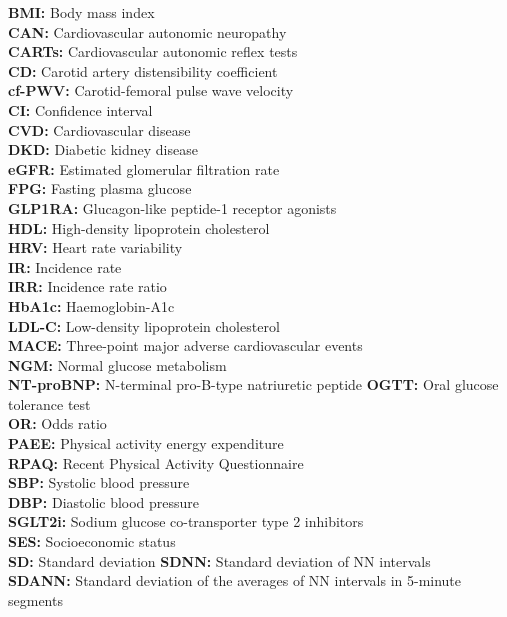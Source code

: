 \documentclass[
  a4paper,
  headsepline=true,
  open=any]{scrbook}
\begin{document}
\textbf{BMI:} Body mass index\\
\textbf{CAN:} Cardiovascular autonomic neuropathy\\
\textbf{CARTs:} Cardiovascular autonomic reflex tests\\
\textbf{CD:} Carotid artery distensibility coefficient\\
\textbf{cf-PWV:} Carotid-femoral pulse wave velocity\\
\textbf{CI:} Confidence interval\\
\textbf{CVD:} Cardiovascular disease\\
\textbf{DKD:} Diabetic kidney disease\\
\textbf{eGFR:} Estimated glomerular filtration rate\\
\textbf{FPG:} Fasting plasma glucose\\
\textbf{GLP1RA:} Glucagon-like peptide-1 receptor agonists\\
\textbf{HDL:} High-density lipoprotein cholesterol\\
\textbf{HRV:} Heart rate variability\\
\textbf{IR:} Incidence rate\\
\textbf{IRR:} Incidence rate ratio\\
\textbf{HbA1c:} Haemoglobin-A1c\\
\textbf{LDL-C:} Low-density lipoprotein cholesterol\\
\textbf{MACE:} Three-point major adverse cardiovascular events\\
\textbf{NGM:} Normal glucose metabolism\\
\textbf{NT-proBNP:} N-terminal pro-B-type natriuretic peptide
\textbf{OGTT:} Oral glucose tolerance test\\
\textbf{OR:} Odds ratio\\
\textbf{PAEE:} Physical activity energy expenditure\\
\textbf{RPAQ:} Recent Physical Activity Questionnaire\\
\textbf{SBP:} Systolic blood pressure\\
\textbf{DBP:} Diastolic blood pressure\\
\textbf{SGLT2i:} Sodium glucose co-transporter type 2 inhibitors\\
\textbf{SES:} Socioeconomic status\\
\textbf{SD:} Standard deviation \textbf{SDNN:} Standard deviation of NN
intervals\\
\textbf{SDANN:} Standard deviation of the averages of NN intervals in
5-minute segments\\
\end{document}
